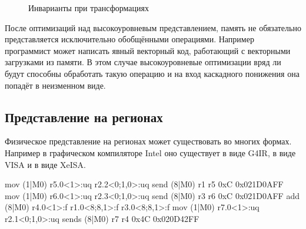 \begin{figure}[ht]
    \caption{Инварианты при трансформациях}\label{fig:highlevel-mgr-inv}
\end{figure}

После оптимизаций над высокоуровневым представлением, память не обязательно представляется исключительно обобщёнными операциями. Например программист может написать явный векторный код, работающий с векторными загрузками из памяти. В этом случае высокоуровневые оптимизации вряд ли будут способны обработать такую операцию и на вход каскадного понижения она попадёт в неизменном виде.

\subsection{Представление на регионах}\label{subsec:lowering/passes/lowlevel}

Физическое представление на регионах может существовать во многих формах. Например в графическом компиляторе Intel оно существует в виде G4IR, в виде VISA и в виде XeISA. 

\begin{ListingEnv}[!h]
    \captiondelim{ } 
    \caption{Пример физического представления}\label{lst:lowering/regrep}
    \begin{Verb}
mov (1|M0) r5.0<1>:uq r2.2<0;1,0>:uq
send (8|M0) r1 r5 0xC 0x021D0AFF
mov (1|M0) r6.0<1>:uq r2.3<0;1,0>:uq
send (8|M0) r3 r6 0xC 0x021D0AFF
add (8|M0) r4.0<1>:f r1.0<8;8,1>:f r3.0<8;8,1>:f
mov (1|M0) r7.0<1>:uq r2.1<0;1,0>:uq
sends (8|M0) r7 r4 0x4C 0x020D42FF
    \end{Verb}
\end{ListingEnv}

